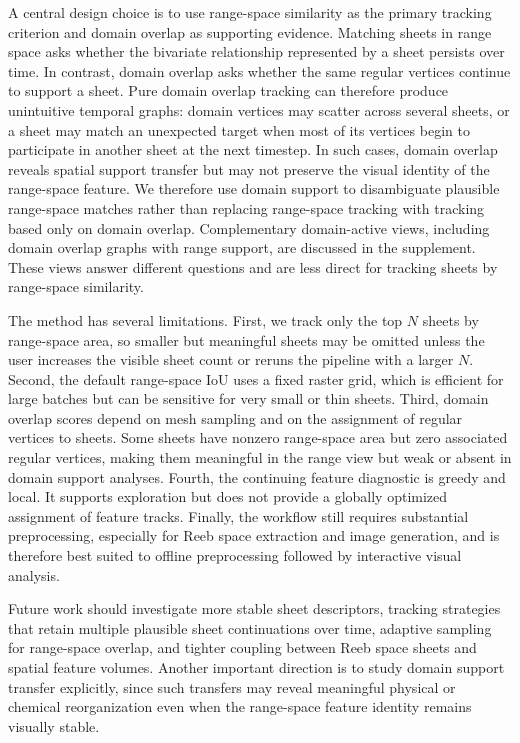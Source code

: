 \documentclass[review]{vgtc}                          %
\begin{document}
A central design choice is to use range-space similarity as the primary tracking criterion and domain overlap as supporting evidence. Matching sheets in range space asks whether the bivariate relationship represented by a sheet persists over time. In contrast, domain overlap asks whether the same regular vertices continue to support a sheet. Pure domain overlap tracking can therefore produce unintuitive temporal graphs: domain vertices may scatter across several sheets, or a sheet may match an unexpected target when most of its vertices begin to participate in another sheet at the next timestep. In such cases, domain overlap reveals spatial support transfer but may not preserve the visual identity of the range-space feature. We therefore use domain support to disambiguate plausible range-space matches rather than replacing range-space tracking with tracking based only on domain overlap. Complementary domain-active views, including domain overlap graphs with range support, are discussed in the supplement. These views answer different questions and are less direct for tracking sheets by range-space similarity.

The method has several limitations. First, we track only the top $N$ sheets by range-space area, so smaller but meaningful sheets may be omitted unless the user increases the visible sheet count or reruns the pipeline with a larger $N$. Second, the default range-space IoU uses a fixed raster grid, which is efficient for large batches but can be sensitive for very small or thin sheets. Third, domain overlap scores depend on mesh sampling and on the assignment of regular vertices to sheets. Some sheets have nonzero range-space area but zero associated regular vertices, making them meaningful in the range view but weak or absent in domain support analyses. Fourth, the continuing feature diagnostic is greedy and local. It supports exploration but does not provide a globally optimized assignment of feature tracks. Finally, the workflow still requires substantial preprocessing, especially for Reeb space extraction and image generation, and is therefore best suited to offline preprocessing followed by interactive visual analysis.

Future work should investigate more stable sheet descriptors, tracking strategies that retain multiple plausible sheet continuations over time, adaptive sampling for range-space overlap, and tighter coupling between Reeb space sheets and spatial feature volumes. Another important direction is to study domain support transfer explicitly, since such transfers may reveal meaningful physical or chemical reorganization even when the range-space feature identity remains visually stable.



\newpage

%

%
%
%


\end{document}
